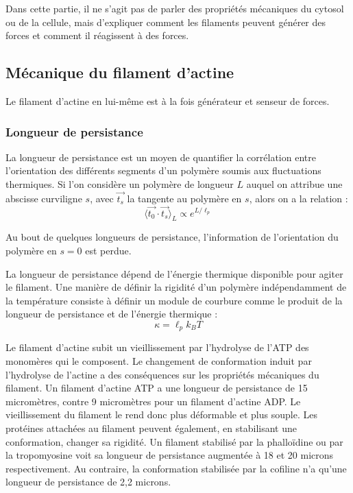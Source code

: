 \documentclass{report}
\begin{document}
Dans cette partie, il ne s'agit pas de parler des propriétés mécaniques du cytosol ou de la cellule, mais d'expliquer comment les filaments peuvent générer des forces et comment il réagissent à des forces. 

\subsection{Mécanique du filament d'actine}

Le filament d'actine en lui-même est à la fois générateur et senseur de forces. 

 \subsubsection{Longueur de persistance}
La longueur de persistance est un moyen de quantifier la corrélation entre l'orientation des différents segments d'un polymère soumis aux fluctuations thermiques. Si l'on considère un polymère de longueur $L$ auquel on attribue une abscisse curviligne $s$, avec $\vec{t_s}$ la tangente au polymère en $s$, alors on a la relation : 
$$ \langle \vec{t_0}\cdot \vec{t_s} \rangle_L \propto e^{L/\ell_p}$$

Au bout de quelques longueurs de persistance, l'information de l'orientation du polymère en $s=0$ est perdue. 

La longueur de persistance dépend de l'énergie thermique disponible pour agiter le filament. Une manière de définir la rigidité d'un polymère indépendamment de la température consiste à définir un module de courbure comme le produit de la longueur de persistance et de l'énergie thermique : $$\kappa = \ell_p k_B T$$


Le filament d'actine subit un vieillissement par l'hydrolyse de l'ATP des monomères qui le composent. Le changement de conformation induit par l'hydrolyse de l'actine a des conséquences sur les propriétés mécaniques du filament. 
Un filament d'actine ATP a une longueur de persistance de 15 micromètres, contre 9 micromètres pour un filament d'actine ADP. Le vieillissement du filament le rend donc plus déformable et plus souple. 
Les protéines attachées au filament peuvent également, en stabilisant une conformation, changer sa rigidité. Un filament stabilisé par la phalloïdine ou par la tropomyosine voit sa longueur de persistance augmentée à 18 et 20 microns respectivement. Au contraire, la conformation stabilisée par la cofiline n'a qu'une longueur de persistance de 2,2 microns. 
\end{document}
